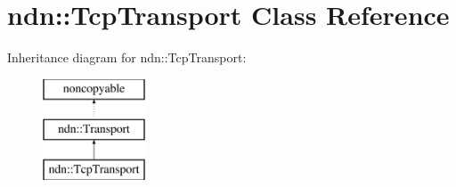\hypertarget{classndn_1_1TcpTransport}{}\section{ndn\+:\+:Tcp\+Transport Class Reference}
\label{classndn_1_1TcpTransport}
Inheritance diagram for ndn\+:\+:Tcp\+Transport\+:\begin{figure}[H]
\begin{center}
\leavevmode
\includegraphics[height=3.000000cm]{classndn_1_1TcpTransport}
\end{center}
\end{figure}
